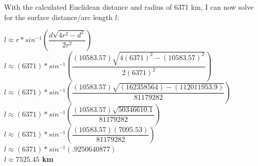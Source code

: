 \documentclass[a4paper]{article}
\begin{document}
With the calculated Euclidean distance and radius of 6371 km, I can now solve for the surface distance/arc length $l$: 

\begin{center}
\textbf{$l \approx r * sin^{-1}\left(\dfrac{d\sqrt{4r^2-d^2}}{2r^2}\right)$}\\
\medskip
\textbf{$l \approx (6371) * sin^{-1}\left(\dfrac{(10583.57)\sqrt{4(6371)^2-(10583.57)^2}}{2(6371)^2}\right)$}\\
\medskip
\textbf{$l \approx (6371) * sin^{-1}\left(\dfrac{(10583.57)\sqrt{(162358564)-(112011953.9)}}{81179282}\right)$}\\
\medskip
\textbf{$l \approx (6371) * sin^{-1}\left(\dfrac{(10583.57)\sqrt{50346610.1}}{81179282}\right)$}\\
\medskip
\textbf{$l \approx (6371) * sin^{-1}\left(\dfrac{(10583.57)(7095.53)}{81179282}\right)$}\\
\medskip
\textbf{$l \approx (6371) * sin^{-1}(.9250640877)$}\\
\medskip
\textbf{$l \approx 7525.45$ km}\\
\medskip
\end{center}
\end{document}
